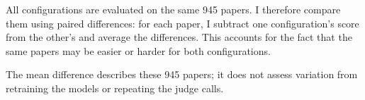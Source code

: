 All configurations are evaluated on the same 945 papers. I therefore compare them using paired differences: for each paper, I subtract one configuration's score from the other's and average the differences. This accounts for the fact that the same papers may be easier or harder for both configurations.

The mean difference describes these 945 papers; it does not assess variation from retraining the models or repeating the judge calls.
